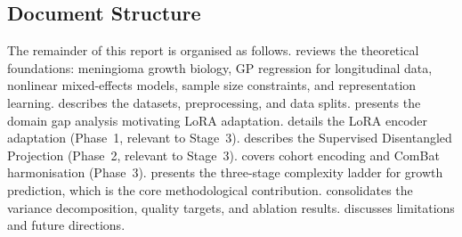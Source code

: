 \subsection{Document Structure}

The remainder of this report is organised as follows.
 reviews the theoretical foundations: meningioma growth
biology, GP regression for longitudinal data, nonlinear mixed-effects models,
sample size constraints, and representation learning.
 describes the datasets, preprocessing, and data splits.
 presents the domain gap analysis motivating LoRA
adaptation.
 details the LoRA encoder adaptation (Phase~1, relevant to
Stage~3).
 describes the Supervised Disentangled Projection (Phase~2,
relevant to Stage~3).
 covers cohort encoding and ComBat harmonisation
(Phase~3).
 presents the three-stage complexity ladder for growth
prediction, which is the core methodological contribution.
 consolidates the variance decomposition, quality
targets, and ablation results.
 discusses limitations and future directions.
